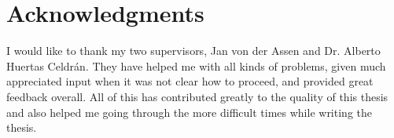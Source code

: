 \chapter*{Acknowledgments}

I would like to thank my two supervisors, Jan von der Assen and Dr. Alberto Huertas Celdrán. They have helped me with all kinds of problems, given much appreciated input when it was not clear how to proceed, and provided great feedback overall. All of this has contributed greatly to the quality of this thesis and also helped me going through the more difficult times while writing the thesis. 